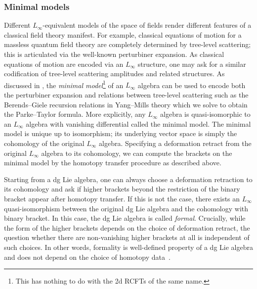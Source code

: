 \documentclass[10pt,a4paper]{amsart}
\numberwithin{equation}{section}
\theoremstyle{definition}
\begin{document}
\subsubsection{Minimal models}
Different $L_\infty$-equivalent models of the space of fields render different features of a classical field theory manifest. For example, classical equations of motion for a massless quantum field theory are completely determined by tree-level scattering; this is articulated via the well-known perturbiner expansion. As classical equations of motion are encoded via an $L_\infty$ structure, one may ask for a similar codification of tree-level scattering amplitudes and related structures. As discussed in \cite{perturbiner,Scattering-recursion}, the \textit{minimal model}\footnote{This has nothing to do with the 2d RCFTs of the same name.} of an $L_{\infty}$ algebra can be used to encode both the perturbiner expansion and relations between tree-level scattering such as the Berends--Giele recursion relations in Yang--Mills theory which we solve to obtain the Parke--Taylor formula. More explicitly, any $L_\infty$ algebra is quasi-isomorphic to an $L_\infty$ algebra with vanishing differential called the minimal model. The minimal model is unique up to isomorphism; its underlying vector space is simply the cohomology of the original $L_{\infty}$ algebra. Specifying a deformation retract from the original $L_\infty$ algebra to its cohomology, we can compute the brackets on the minimal model by the homotopy transfer procedure as described above.

Starting from a dg Lie algebra, one can always choose a deformation retraction to its cohomology and ask if higher brackets beyond the restriction of the binary bracket appear after homotopy transfer. If this is not the case, there exists an $L_\infty$ quasi-isomorphism between the original dg Lie algebra and the cohomology with binary bracket. In this case, the dg Lie algebra is called \emph{formal}. Crucially, while the form of the higher brackets depends on the choice of deformation retract, the question whether there are non-vanishing higher brackets at all is independent of such choices. In other words, formality is well-defined property of a dg Lie algebra and does not depend on the choice of homotopy data~\cite{LodayVallette}.
\end{document}
